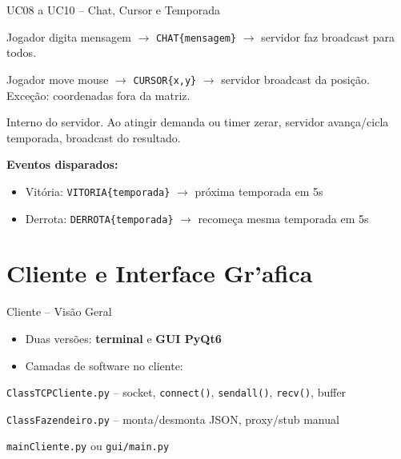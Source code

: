 \documentclass[aspectratio=169]{beamer}
\begin{document}
\begin{frame}{UC08 a UC10 -- Chat, Cursor e Temporada}
  \begin{description}
    \item[UC08 - Chat] Jogador digita mensagem $\rightarrow$ \texttt{CHAT\{mensagem\}} $\rightarrow$ servidor faz broadcast para todos.
    \item[UC09 - Cursor] Jogador move mouse $\rightarrow$ \texttt{CURSOR\{x,y\}} $\rightarrow$ servidor broadcast da posi\c{c}\~ao. Exce\c{c}\~ao: coordenadas fora da matriz.
    \item[UC10 - Temporada] Interno do servidor. Ao atingir demanda ou timer zerar, servidor avança/cicla temporada, broadcast do resultado.
  \end{description}
  \vfill
  \textbf{Eventos disparados:}
  \begin{itemize}
    \item Vit\'oria: \texttt{VITORIA\{temporada\}} $\rightarrow$ pr\'oxima temporada em 5s
    \item Derrota: \texttt{DERROTA\{temporada\}} $\rightarrow$ recome\c{c}a mesma temporada em 5s
  \end{itemize}
\end{frame}

\section{Cliente e Interface Gr'afica}

\begin{frame}{Cliente -- Vis\~ao Geral}
  \begin{itemize}
    \item Duas vers\~oes: \textbf{terminal} e \textbf{GUI PyQt6}
    \item Camadas de software no cliente:
  \end{itemize}
  \vfill
  \begin{center}
  \end{center}
  \vfill
  \begin{description}
    \item[TCP Cliente:] \texttt{ClassTCPCliente.py} -- socket, \texttt{connect()}, \texttt{sendall()}, \texttt{recv()}, buffer
    \item[Proxy:] \texttt{ClassFazendeiro.py} -- monta/desmonta JSON, proxy/stub manual
    \item[Aplica\c{c}\~ao:] \texttt{mainCliente.py} ou \texttt{gui/main.py}
  \end{description}
\end{frame}
\end{document}
